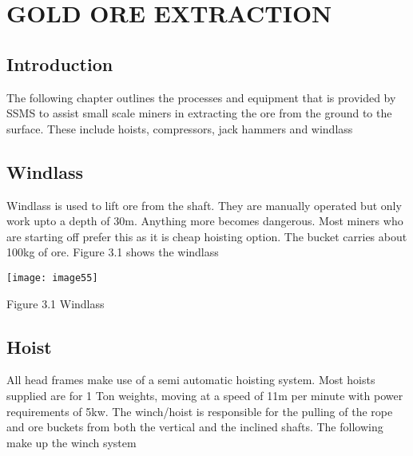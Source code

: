 \chapter{ GOLD ORE EXTRACTION}


\section{  Introduction}

\noindent The following chapter outlines the processes and equipment that is provided by SSMS to assist small scale miners in extracting the ore from the ground to the surface. These include hoists, compressors, jack hammers and windlass \par


\section{ Windlass}

\noindent Windlass is used to lift ore from the shaft. They are manually operated but only work upto a depth of 30m. Anything more becomes dangerous. Most miners who are starting off prefer this as it is cheap hoisting option. The bucket carries about 100kg of ore.  Figure 3.1 shows the windlass \par

\noindent \texttt{[image: image55]}

\noindent Figure 3.1 Windlass


\section{ Hoist}

\noindent All head frames make use of a semi automatic hoisting system. Most hoists supplied are for 1 Ton weights, moving at a speed of 11m per minute with power requirements of 5kw. The winch/hoist is responsible for the pulling of the rope and ore buckets from both the vertical and the inclined shafts. The following make up the winch system\par

